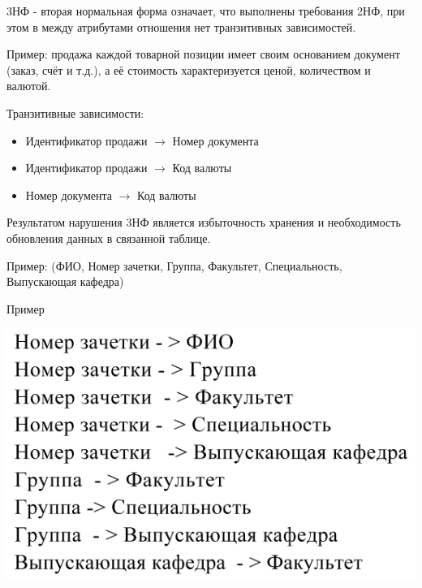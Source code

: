\documentclass{beamer}
\begin{document}
\begin{frame}
\begin{block}{3НФ - вторая нормальная форма}
означает, что выполнены требования 2НФ, при этом в между атрибутами отношения нет транзитивных
зависимостей.
\end{block}
Пример: продажа каждой товарной позиции имеет своим основанием документ (заказ, счёт и т.д.), а её стоимость характеризуется ценой, количеством и валютой.

Транзитивные зависимости:
\begin{itemize}
\item Идентификатор продажи $\rightarrow$ Номер документа
\item Идентификатор продажи $\rightarrow$ Код валюты
\item Номер документа $\rightarrow$ Код валюты
\end{itemize}
Результатом нарушения 3НФ является избыточность хранения и необходимость обновления данных в связанной таблице.
\end{frame}

\begin{frame}
Пример: (ФИО, Номер зачетки, Группа, Факультет, Специальность, Выпускающая кафедра)
\begin{block}{Пример}
\begin{center}
\includegraphics[scale=0.5]{images/nf-3.png}
\end{center}
\end{block}
\end{frame}
\end{document}
